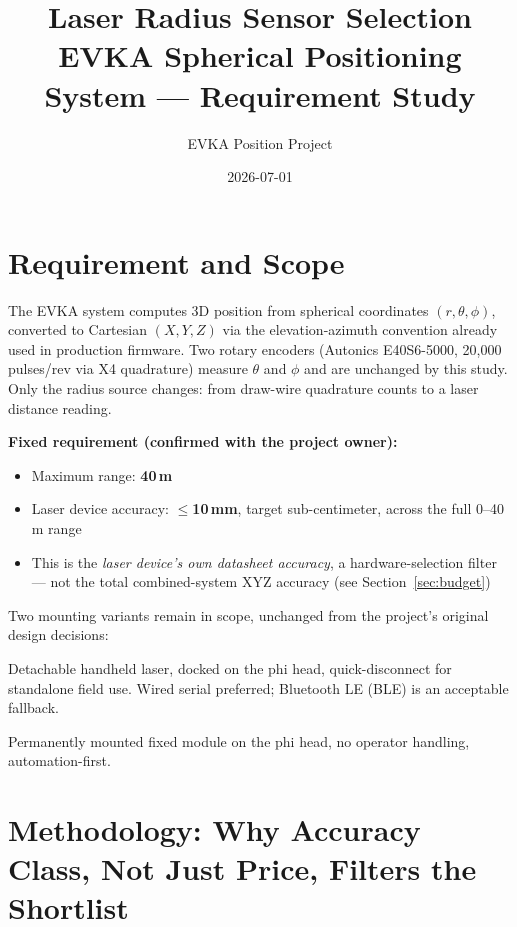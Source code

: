 \documentclass[11pt]{article}
\title{\textbf{Laser Radius Sensor Selection}\\[0.3em]
\large EVKA Spherical Positioning System --- Requirement Study}
\author{EVKA Position Project}
\date{2026-07-01}
\begin{document}
\maketitle

\section{Requirement and Scope}

The EVKA system computes 3D position from spherical coordinates $(r,\theta,\phi)$, converted to Cartesian $(X,Y,Z)$ via the elevation-azimuth convention already used in production firmware. Two rotary encoders (Autonics E40S6-5000, 20{,}000 pulses/rev via X4 quadrature) measure $\theta$ and $\phi$ and are unchanged by this study. Only the radius source changes: from draw-wire quadrature counts to a laser distance reading.

\textbf{Fixed requirement (confirmed with the project owner):}
\begin{itemize}[nosep]
  \item Maximum range: \textbf{40\,m}
  \item Laser device accuracy: \textbf{$\leq$10\,mm}, target sub-centimeter, across the full 0--40\,m range
  \item This is the \emph{laser device's own datasheet accuracy}, a hardware-selection filter --- not the total combined-system XYZ accuracy (see Section~\ref{sec:budget})
\end{itemize}

Two mounting variants remain in scope, unchanged from the project's original design decisions:

\begin{description}[leftmargin=1.2cm]
  \item[Version A] Detachable handheld laser, docked on the phi head, quick-disconnect for standalone field use. Wired serial preferred; Bluetooth LE (BLE) is an acceptable fallback.
  \item[Version B] Permanently mounted fixed module on the phi head, no operator handling, automation-first.
\end{description}

\section{Methodology: Why Accuracy Class, Not Just Price, Filters the Shortlist}
\end{document}
